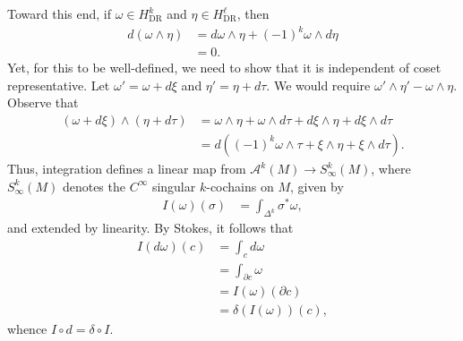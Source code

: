 \documentclass[10pt]{mypackage}
\begin{document}
Toward this end, if $\omega\in H^{k}_{\operatorname{DR}}$ and $\eta\in H^{\ell}_{\operatorname{DR}}$, then
\begin{align*}
  d\left( \omega\wedge\eta \right) &= d\omega\wedge\eta + \left( -1 \right)^{k} \omega\wedge d\eta\\
                                   &= 0.
\end{align*}
Yet, for this to be well-defined, we need to show that it is independent of coset representative. Let $\omega' = \omega + d\xi$ and $\eta' = \eta + d\tau$. We would require $\omega'\wedge\eta' - \omega\wedge\eta$. Observe that
\begin{align*}
  \left( \omega + d\xi \right)\wedge \left( \eta + d\tau \right) &= \omega\wedge\eta + \omega\wedge d\tau + d\xi\wedge\eta + d\xi\wedge d\tau\\
                                                                 &= d\left( \left( -1 \right)^{k}\omega\wedge\tau + \xi\wedge\eta + \xi\wedge d\tau \right).
\end{align*}
Thus, integration defines a linear map from $\mathcal{A}^{k}\left( M \right)\rightarrow S^{k}_{\infty}\left( M \right)$, where $S^{k}_{\infty}\left( M \right)$ denotes the $C^{\infty}$ singular $k$-cochains on $M$, given by
\begin{align*}
  I\left( \omega \right)\left( \sigma \right) &= \int_{\Delta^{k}}^{} \sigma^{\ast}\omega,
\end{align*}
and extended by linearity. By Stokes, it follows that
\begin{align*}
  I\left( d\omega \right)\left( c \right) &= \int_{c}^{}d\omega\\
                                          &= \int_{\partial c}^{} \omega\\
                                          &= I(\omega)\left( \partial c \right)\\
                                          &= \delta\left( I\left( \omega \right) \right)(c),
\end{align*}
whence $I\circ d = \delta\circ I$.
\end{document}
